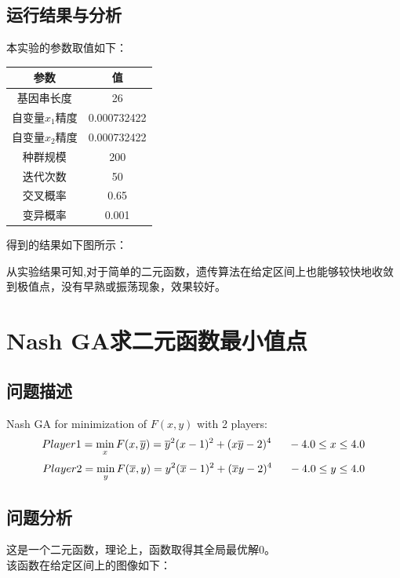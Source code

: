 \documentclass[UTF8]{ctexart}
\begin{document}
\subsection{运行结果与分析}
\indent 本实验的参数取值如下：
\begin{center}
\begin{tabular}{cc}
  \toprule
  参数 & 值 \\
  \midrule
  基因串长度 & 26 \\
  自变量$x_1$精度 & 0.000732422\\
  自变量$x_2$精度 & 0.000732422\\
  种群规模   & 200 \\
  迭代次数   & 50 \\
  交叉概率   & 0.65 \\
  变异概率   & 0.001 \\
  \bottomrule
\end{tabular}
\end{center}
得到的结果如下图所示：
\begin{center}
\end{center}

\indent 从实验结果可知,对于简单的二元函数，遗传算法在给定区间上也能够较快地收敛到极值点，没有早熟或振荡现象，效果较好。

\section{Nash GA求二元函数最小值点}

\subsection{问题描述}
Nash GA for minimization of $F(x,y)$ with 2 players:
\[ Player1=\min_x F(x,\overline{y})={\overline{y}}^2 (x-1)^2+(x \overline{y}-2)^4 \indent -4.0 \leq x \leq 4.0 \\ \]
\[ Player2=\min_y F(\overline{x},y)=y^2 (\overline{x}-1)^2+(\overline{x}y-2)^4 \indent -4.0 \leq y \leq 4.0 \\ \]

\subsection{问题分析}
这是一个二元函数，理论上，函数取得其全局最优解0。\\
\indent 该函数在给定区间上的图像如下：\\
\end{document}
